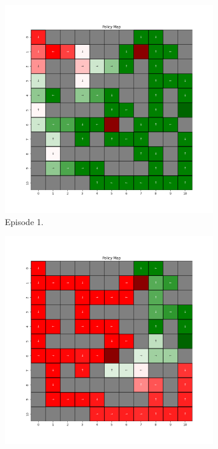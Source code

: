 \documentclass{assignment}
\begin{document}
\begin{figure}[H]
    \begin{subfigure}{0.3\textwidth}
        \includegraphics[width=\textwidth]{figures/policy_q/gamma_sweep/policy_alpha_0.1_gamma_0.1_epsilon_0.2_iteration_1.png}
    \caption{Episode 1.}
    \end{subfigure}\hfill
    \begin{subfigure}{0.3\textwidth}
        \includegraphics[width=\textwidth]{figures/policy_q/gamma_sweep/policy_alpha_0.1_gamma_0.1_epsilon_0.2_iteration_50.png}

\end{subfigure}
\end{figure}
\end{document}
